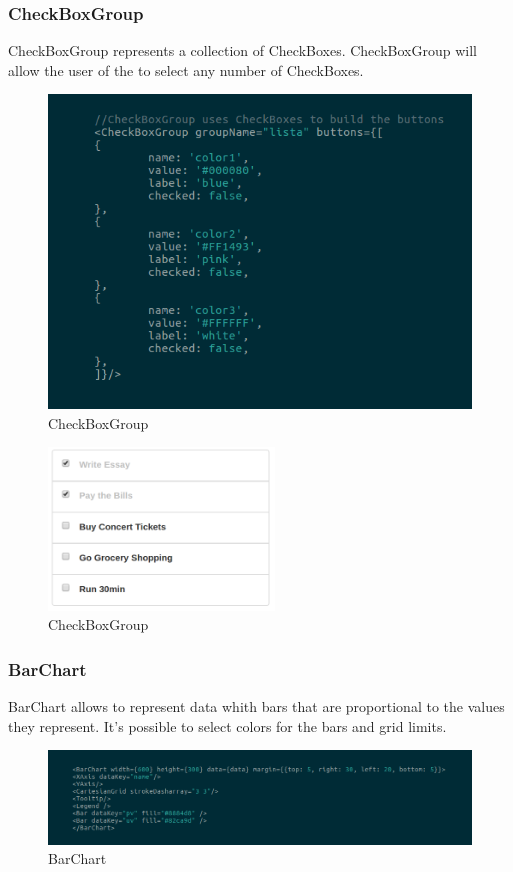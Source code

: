 \subsubsection{CheckBoxGroup}
CheckBoxGroup represents a collection of CheckBoxes.
CheckBoxGroup will allow the user of the  to select any number of CheckBoxes.
\begin{figure}[H]
	\centering
	\includegraphics[width=14cm]{../../documenti/UserManualFramework/framework_view/10framework_view_check_group.png}
	\caption{CheckBoxGroup}
\end{figure}

\begin{figure}[H]
	\centering
	\includegraphics[width=6cm]{../../documenti/UserManualFramework/graphical_elements/checkBoxGroupGE.png}
	\caption{CheckBoxGroup}
\end{figure}

\subsubsection{BarChart}
BarChart allows to represent data whith bars that are proportional to the values they represent. It's possible to select colors for the bars and grid limits.
\begin{figure}[H]
	\centering
	\includegraphics[width=14cm]{../../documenti/UserManualFramework/framework_view/18framework_view_bar.png}
	\caption{BarChart}
\end{figure}

